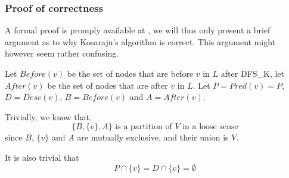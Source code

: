 \subsubsection{Proof of correctness}
A formal proof is promply available at \cite[p.~619]{intro-alg}, we will thus only present a brief argument as to why Kosaraju's algorithm is correct. This argument might however seem rather confusing.\par
Let $Before(v)$ be the set of nodes that are before $v$ in $L$ after \textsc{DFS\_K}, let $After(v)$ be the set of nodes that are after $v$ in $L$. Let $P = Pred(v)=P$, $D = Desc(v)$, $B = Before(v)$ and $A=After(v)$.\par
Trivially, we know that,
\begin{equation} \label{eq:ABpart}
    \{B, \{v\}, A\}\text{ is a partition of $V$ in a loose sense}
\end{equation}
since $B$, $\{v\}$ and $A$ are mutually exclusive, and their union is $V$.\par
It is also trivial that
\begin{equation} \label{eq:vnotinPD}
    P \cap \{v\} = D\cap\{v\}=\emptyset
\end{equation}

